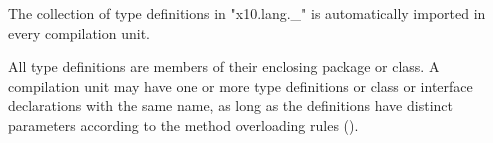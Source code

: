 The collection of type definitions in
\xcdmath"x10.lang.\_" is automatically imported in every compilation unit.
\label{X10LangUnderscore}

All type definitions are members of their enclosing package or
class.  A compilation unit may have one or more type definitions
or class or interface declarations with the same name, as long
as the definitions have distinct parameters according to the
method overloading rules ().
\fi

